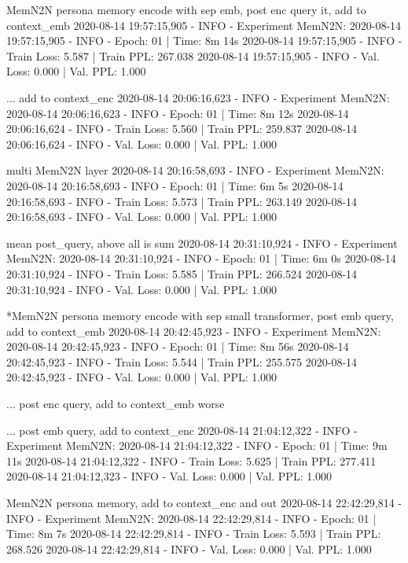 \documentclass[letterpaper]{article} %
\begin{document}
\begin{CJK*}{UTF8}{gbsn}
MemN2N persona memory encode with sep emb, post enc query it, add to context_emb
2020-08-14 19:57:15,905 - INFO - Experiment MemN2N: 
2020-08-14 19:57:15,905 - INFO - Epoch: 01 | Time: 8m 14s
2020-08-14 19:57:15,905 - INFO - 	Train Loss: 5.587 | Train PPL: 267.038
2020-08-14 19:57:15,905 - INFO - 	 Val. Loss: 0.000 |  Val. PPL:   1.000

... add to context_enc
2020-08-14 20:06:16,623 - INFO - Experiment MemN2N: 
2020-08-14 20:06:16,623 - INFO - Epoch: 01 | Time: 8m 12s
2020-08-14 20:06:16,624 - INFO - 	Train Loss: 5.560 | Train PPL: 259.837
2020-08-14 20:06:16,624 - INFO - 	 Val. Loss: 0.000 |  Val. PPL:   1.000

multi MemN2N layer
2020-08-14 20:16:58,693 - INFO - Experiment MemN2N: 
2020-08-14 20:16:58,693 - INFO - Epoch: 01 | Time: 6m 5s
2020-08-14 20:16:58,693 - INFO - 	Train Loss: 5.573 | Train PPL: 263.149
2020-08-14 20:16:58,693 - INFO - 	 Val. Loss: 0.000 |  Val. PPL:   1.000


mean post_query, above all is sum
2020-08-14 20:31:10,924 - INFO - Experiment MemN2N: 
2020-08-14 20:31:10,924 - INFO - Epoch: 01 | Time: 6m 0s
2020-08-14 20:31:10,924 - INFO - 	Train Loss: 5.585 | Train PPL: 266.524
2020-08-14 20:31:10,924 - INFO - 	 Val. Loss: 0.000 |  Val. PPL:   1.000

*MemN2N persona memory encode with sep small transformer, post emb query, add to context_emb
2020-08-14 20:42:45,923 - INFO - Experiment MemN2N: 
2020-08-14 20:42:45,923 - INFO - Epoch: 01 | Time: 8m 56s
2020-08-14 20:42:45,923 - INFO - 	Train Loss: 5.544 | Train PPL: 255.575
2020-08-14 20:42:45,923 - INFO - 	 Val. Loss: 0.000 |  Val. PPL:   1.000

... post enc query, add to context_emb
worse

... post emb query, add to context_enc
2020-08-14 21:04:12,322 - INFO - Experiment MemN2N: 
2020-08-14 21:04:12,322 - INFO - Epoch: 01 | Time: 9m 11s
2020-08-14 21:04:12,322 - INFO - 	Train Loss: 5.625 | Train PPL: 277.411
2020-08-14 21:04:12,323 - INFO - 	 Val. Loss: 0.000 |  Val. PPL:   1.000

MemN2N persona memory, add to context_enc and out
2020-08-14 22:42:29,814 - INFO - Experiment MemN2N: 
2020-08-14 22:42:29,814 - INFO - Epoch: 01 | Time: 8m 7s
2020-08-14 22:42:29,814 - INFO - 	Train Loss: 5.593 | Train PPL: 268.526
2020-08-14 22:42:29,814 - INFO - 	 Val. Loss: 0.000 |  Val. PPL:   1.000


\end{CJK*}
\end{document}
